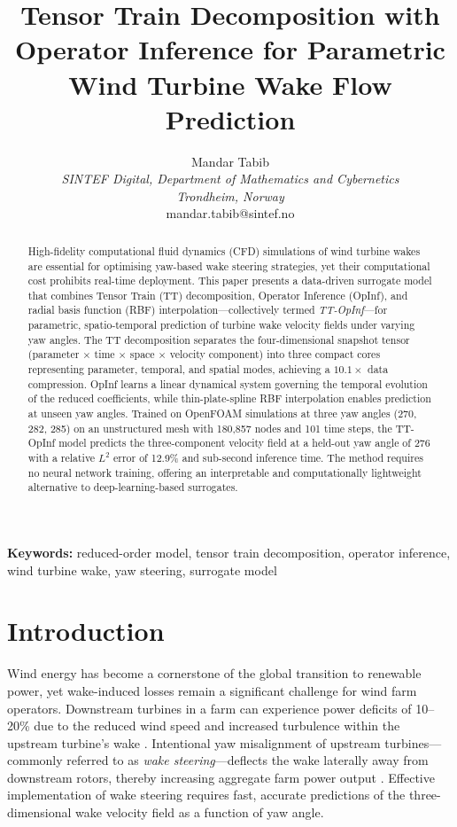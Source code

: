 \documentclass[12pt]{article}
\title{Tensor Train Decomposition with Operator Inference for Parametric Wind Turbine Wake Flow Prediction}
\author{
  Mandar Tabib \\
  \textit{SINTEF Digital, Department of Mathematics and Cybernetics} \\
  \textit{Trondheim, Norway} \\
  mandar.tabib@sintef.no
}
\date{}
\begin{document}
\maketitle

\begin{abstract}
High-fidelity computational fluid dynamics (CFD) simulations of wind turbine wakes are essential for optimising yaw-based wake steering strategies, yet their computational cost prohibits real-time deployment.
This paper presents a data-driven surrogate model that combines Tensor Train (TT) decomposition, Operator Inference (OpInf), and radial basis function (RBF) interpolation---collectively termed \emph{TT-OpInf}---for parametric, spatio-temporal prediction of turbine wake velocity fields under varying yaw angles.
The TT decomposition separates the four-dimensional snapshot tensor (parameter $\times$ time $\times$ space $\times$ velocity component) into three compact cores representing parameter, temporal, and spatial modes, achieving a $10.1\times$ data compression.
OpInf learns a linear dynamical system governing the temporal evolution of the reduced coefficients, while thin-plate-spline RBF interpolation enables prediction at unseen yaw angles.
Trained on OpenFOAM simulations at three yaw angles (270\textdegree, 282\textdegree, 285\textdegree) on an unstructured mesh with 180{,}857 nodes and 101 time steps, the TT-OpInf model predicts the three-component velocity field at a held-out yaw angle of 276\textdegree{} with a relative $L^2$ error of 12.9\% and sub-second inference time.
The method requires no neural network training, offering an interpretable and computationally lightweight alternative to deep-learning-based surrogates.
\end{abstract}

\noindent\textbf{Keywords:} reduced-order model, tensor train decomposition, operator inference, wind turbine wake, yaw steering, surrogate model

\section{Introduction}
\label{sec:introduction}

Wind energy has become a cornerstone of the global transition to renewable power, yet wake-induced losses remain a significant challenge for wind farm operators.
Downstream turbines in a farm can experience power deficits of 10--20\% due to the reduced wind speed and increased turbulence within the upstream turbine's wake \citep{Barthelmie2009,PorteAgel2020}.
Intentional yaw misalignment of upstream turbines---commonly referred to as \emph{wake steering}---deflects the wake laterally away from downstream rotors, thereby increasing aggregate farm power output \citep{Fleming2017,Gebraad2016}.
Effective implementation of wake steering requires fast, accurate predictions of the three-dimensional wake velocity field as a function of yaw angle.
\end{document}
